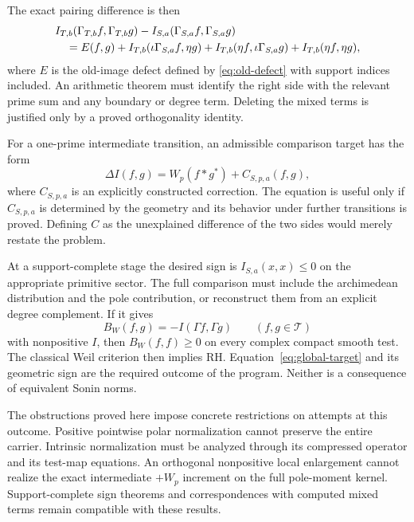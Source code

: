 \documentclass[11pt,letterpaper]{article}
\theoremstyle{definition}
\theoremstyle{remark}
\newcommand{\T}{\mathcal T}
\begin{document}
The exact pairing difference is then
\begin{align}
 &I_{T,b}(\Gamma_{T,b}f,\Gamma_{T,b}g)
       -I_{S,a}(\Gamma_{S,a}f,\Gamma_{S,a}g)\notag\\
 &\quad=E(f,g)
   +I_{T,b}(\iota\Gamma_{S,a}f,\eta g)
   +I_{T,b}(\eta f,\iota\Gamma_{S,a}g)
   +I_{T,b}(\eta f,\eta g),
 \label{eq:full-expansion}
\end{align}
where $E$ is the old-image defect defined by
\eqref{eq:old-defect} with support indices included.
An arithmetic theorem must identify the right side with
the relevant prime sum and any boundary or degree term.
Deleting the mixed terms is justified only by a proved
orthogonality identity.

For a one-prime intermediate transition, an admissible
comparison target has the form
\begin{equation}
 \Delta I(f,g)=W_p(f*g^*)+C_{S,p,a}(f,g),
 \label{eq:corrected-comparison}
\end{equation}
where $C_{S,p,a}$ is an explicitly constructed correction.
The equation is useful only if $C_{S,p,a}$ is determined
by the geometry and its behavior under further transitions
is proved. Defining $C$ as the unexplained difference of
the two sides would merely restate the problem.

At a support-complete stage the desired sign is
$I_{S,a}(x,x)\leq0$ on the appropriate primitive sector.
The full comparison must include the archimedean
distribution and the pole contribution, or reconstruct
them from an explicit degree complement. If it gives
\begin{equation}
 B_W(f,g)=-I(\Gamma f,\Gamma g)\qquad(f,g\in\T)
 \label{eq:global-target}
\end{equation}
with nonpositive $I$, then $B_W(f,f)\geq0$ on every
complex compact smooth test. The classical Weil criterion
then implies RH. Equation~\eqref{eq:global-target} and its
geometric sign are the required outcome of the program.
Neither is a consequence of equivalent Sonin norms.

The obstructions proved here impose concrete restrictions
on attempts at this outcome. Positive pointwise polar
normalization cannot preserve the entire carrier. Intrinsic
normalization must be analyzed through its compressed
operator and its test-map equations. An orthogonal
nonpositive local enlargement cannot realize the exact
intermediate $+W_p$ increment on the full pole-moment
kernel. Support-complete sign theorems and correspondences
with computed mixed terms remain compatible with these
results.
\end{document}

